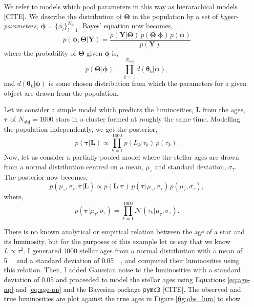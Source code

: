 We refer to models which pool parameters in this way as hierarachical models [CITE]. We describe the distribution of $\bm{\Theta}$ in the population by a set of \emph{hyper-parameters}, $\bm{\phi} = \{ \phi_l \}_{l=1}^{N_\phi}$. Bayes' equation now becomes,
%
\begin{equation}
    p(\bm{\phi}, \bm{\Theta} | \bm{Y}) = \frac{p(\bm{Y} | \bm{\Theta}) \, p(\bm{\Theta} | \bm{\phi}) \, p(\bm{\phi})}{p(\bm{Y})}
\end{equation}
%
where the probability of $\bm{\Theta}$ given $\bm{\phi}$ is,
%
\begin{equation}
    p(\bm{\Theta} | \bm{\phi}) = \prod_{k=1}^{N_\mathrm{obj}} d(\bm{\theta}_k | \bm{\phi}),
\end{equation}
%
and $d(\bm{\theta}_k | \bm{\phi})$ is some chosen distribution from which the parameters for a given object are drawn from the population.

Let us consider a simple model which predicts the luminosities, $\bm{L}$ from the ages, $\bm{\tau}$ of $N_\mathrm{obj} = 1000$ stars in a cluster formed at roughly the same time. Modelling the population independently, we get the posterior,
%
\begin{equation}
    p(\bm{\tau} | \bm{L}) \propto \prod_{k=1}^{1000} p(L_k | \tau_k) \, p(\tau_k).
    \label{eq:age-np}
\end{equation}
%
Now, let us consider a partially-pooled model where the stellar ages are drawn from a normal distribution centred on a mean, $\mu_\tau$ and standard deviation, $\sigma_\tau$. The posterior now becomes,
%
\begin{equation}
    p(\mu_\tau, \sigma_\tau, \bm{\tau} | \bm{L}) \propto p(\bm{L} | \bm{\tau}) \, p(\bm{\tau} | \mu_\tau, \sigma_\tau) \, p(\mu_\tau, \sigma_\tau),
    \label{eq:age-pp}
\end{equation}
%
where,
%
\begin{equation}
    p(\bm{\tau} | \mu_\tau, \sigma_\tau) = \prod_{k=1}^{1000} \mathcal{N}(\tau_k | \mu_\tau, \sigma_\tau).
\end{equation}

There is no known analytical or empirical relation between the age of a star and its luminosity, but for the purposes of this example let us say that we know $L \propto \tau^{2}$. I generated 1000 stellar ages from a normal distribution with a mean of \SI{5}{\giga\year} and a standard deviation of \SI{0.05}{\giga\year}, and computed their luminosities using this relation. Then, I added Gaussian noise to the luminosities with a standard deviation of \SI{0.05}{\solarluminosity} and proceeded to model the stellar ages using Equations \ref{eq:age-np} and \ref{eq:age-pp} and the Bayesian package \texttt{pymc3} [CITE]. The observed and true luminosities are plot against the true ages in Figure \ref{fig:obs_lum} to show

